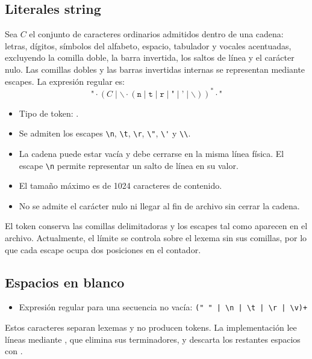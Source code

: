 \subsection{Literales string}
Sea $C$ el conjunto de caracteres ordinarios admitidos dentro de una cadena:
letras, dígitos, símbolos del alfabeto, espacio, tabulador y vocales acentuadas,
excluyendo la comilla doble, la barra invertida, los saltos de línea y el
carácter nulo. Las comillas dobles y las barras invertidas internas se
representan mediante escapes. La expresión regular es:
\[
\texttt{"}\cdot
\left(C\mid
\backslash\cdot
(\texttt{n}\mid\texttt{t}\mid\texttt{r}\mid
\texttt{"}\mid\texttt{'}\mid\backslash)
\right)^*\cdot\texttt{"}
\]
\begin{itemize}[leftmargin=*]
  \item Tipo de token: .
  \item Se admiten los escapes \verb~\n~, \verb~\t~, \verb~\r~,
        \verb~\"~, \verb~\'~ y \verb~\\~.
  \item La cadena puede estar vacía y debe cerrarse en la misma línea física.
        El escape \verb~\n~ permite representar un salto de línea en su valor.
  \item El tamaño máximo es de 1024 caracteres de contenido.
  \item No se admite el carácter nulo ni llegar al fin de archivo sin cerrar
        la cadena.
\end{itemize}
El token conserva las comillas delimitadoras y los escapes tal como aparecen
en el archivo. Actualmente, el límite se controla sobre el lexema sin sus
comillas, por lo que cada escape ocupa dos posiciones en el contador.


\subsection{Espacios en blanco}
\begin{itemize}[leftmargin=*]
  \item Expresión regular para una secuencia no vacía:
        \verb~(" " | \n | \t | \r | \v)+~
\end{itemize}
Estos caracteres separan lexemas y no producen tokens. La implementación lee
líneas mediante , que elimina sus
terminadores, y descarta los restantes espacios con
.

